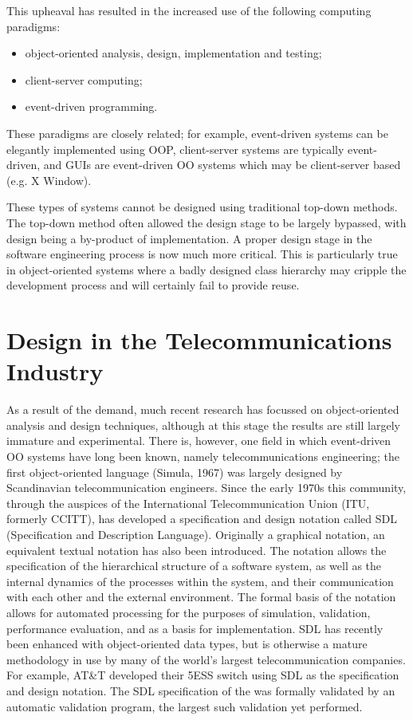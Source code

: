 This upheaval has  resulted in the increased use of the following
computing paradigms:

\begin{itemize}
\item object-oriented analysis, design, implementation and testing;
\item client-server computing;
\item event-driven programming.
\end{itemize}

These paradigms are closely related; for example, event-driven systems
can be elegantly implemented using OOP, client-server systems are typically
event-driven, and GUIs are event-driven OO systems which may be
client-server based (e.g. X Window).

These types of systems cannot be designed using traditional top-down
methods. The top-down method often allowed the design stage to be 
largely bypassed, with design being a by-product of implementation.
A proper design stage in the software
engineering process is now much more critical. This is particularly
true in object-oriented systems where a badly designed class 
hierarchy may cripple the development process and will certainly
fail to provide reuse.

\section{Design in the Telecommunications Industry}

As a result of the demand, much recent research has focussed on
object-oriented analysis and design techniques, although at this
stage the results are still largely immature and experimental.
There is, however, one field in which event-driven OO
systems have long been known, namely telecommunications
engineering; the first object-oriented language
(Simula, 1967) was largely designed by Scandinavian telecommunication
engineers.
Since the early 1970s this community, through the auspices of the
International Telecommunication Union (ITU, formerly CCITT),
has developed a specification and
design notation called SDL (Specification and Description
Language)\cite{itusdl}.
Originally a graphical notation, an equivalent textual notation 
has also been introduced. The notation allows the specification of
the hierarchical structure
of a software system, as well as the internal dynamics of the processes
within the system, and their communication with each other and
the external environment.
The formal basis of the notation allows
for automated processing for the purposes of simulation, validation,
performance evaluation, and as a basis for implementation.
SDL has recently been enhanced with object-oriented data types,
but is otherwise a mature methodology in use by many of the world's 
largest telecommunication companies. For example, AT\&T developed
their 5ESS switch using SDL as the specification and design notation.
The SDL specification of the was formally validated by an automatic
validation program, the largest such validation yet
performed\cite{sdlholz}.

